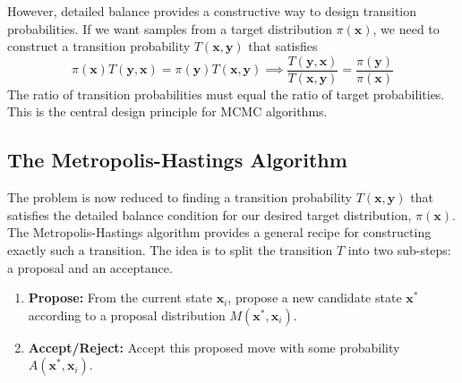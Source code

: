 However, detailed balance provides a constructive way to design transition probabilities. If we want samples from a target distribution $\pi(\mathbf{x})$, we need to construct a transition probability $T(\mathbf{x}, \mathbf{y})$ that satisfies
\begin{equation}
    \pi(\mathbf{x}) T(\mathbf{y}, \mathbf{x}) = \pi(\mathbf{y}) T(\mathbf{x}, \mathbf{y})
    \implies
    \frac{T(\mathbf{y}, \mathbf{x})}{T(\mathbf{x}, \mathbf{y})} = \frac{\pi(\mathbf{y})}{\pi(\mathbf{x})}
\end{equation}
The ratio of transition probabilities must equal the ratio of target probabilities. This is the central design principle for MCMC algorithms.

\subsection{The Metropolis-Hastings Algorithm}
The problem is now reduced to finding a transition probability $T(\mathbf{x}, \mathbf{y})$ that satisfies the detailed balance condition for our desired target distribution, $\pi(\mathbf{x})$. The Metropolis-Hastings algorithm provides a general recipe for constructing exactly such a transition. The idea is to split the transition $T$ into two sub-steps: a proposal and an acceptance.
\begin{enumerate}
    \item \textbf{Propose:} From the current state $\mathbf{x}_i$, propose a new candidate state $\mathbf{x}^*$ according to a proposal distribution $M(\mathbf{x}^*, \mathbf{x}_i)$.
    \item \textbf{Accept/Reject:} Accept this proposed move with some probability $A(\mathbf{x}^*, \mathbf{x}_i)$.
\end{enumerate}

